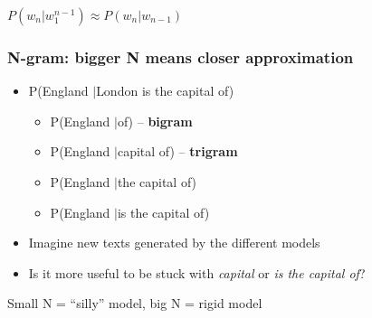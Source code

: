 \documentclass{beamer}
\begin{document}
\begin{frame}
\vspace{0.2cm}

\begin{center}
$P(w_n \vert w_1^{n-1}) \approx P(w_n\vert w_{n-1})$
\end{center}

\vspace{0.5cm}

\end{frame}

\begin{frame}
\frametitle{N-gram: bigger N means closer approximation}

\begin{itemize}
\item P(England $\vert $London is the capital of)
\begin{itemize}
\item P(England $\vert $of) -- {\bf bigram}
\item P(England $\vert $capital of) -- {\bf trigram}
\item P(England $\vert $the capital of)
\item P(England $\vert $is the capital of)
\end{itemize}
\end{itemize}

\vspace{0.2cm}

\begin{itemize}
    \item Imagine new texts generated by the different models
    \item Is it more useful to be stuck with {\it capital} or {\it is the capital of}?
\end{itemize}

\vspace{0.2cm}



Small N = ``silly'' model, big N = rigid model

\end{frame}
\end{document}
